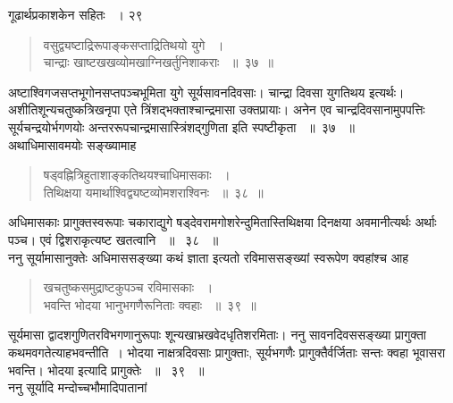 \documentclass[11pt, openany]{book}
\begin{document}
\newpage

\hspace{3cm} गूढार्थप्रकाशकेन सहितः ~। \hfill २९
\vspace{1cm}

 
 \begin{quote}
{\ssi वसुद्व्यष्टाद्रिरूपाङ्कसप्ताद्रितिथयो युगे ~।\\
चान्द्राः खाष्टखखव्योमखाग्निखर्तुनिशाकराः ~॥~३७~॥}
\end{quote}
\begin{sloppypar}
अष्टाश्विगजसप्तभूगोनसप्तपञ्चभूमिता युगे सूर्यसावनदिवसाः। चान्द्रा
दिवसा युगतिथय इत्यर्थः। अशीतिशून्यचतुष्कत्रिखनृपा एते त्रिंशद्भक्ताश्चान्द्रमासा उक्तप्रायाः। अनेन एव चान्द्रदिवसानामुपपत्तिः सूर्यचन्द्रयोर्भगणयोः अन्तररूपचान्द्रमासास्त्रिंशद्गुणिता इति स्पष्टीकृता ~॥~३७~ ॥\\ 
\noindent अथाधिमासावमयोः सङ्ख्यामाह\textendash
\end{sloppypar}
\begin{quote}
 
{\ssi षड्वह्नित्रिहुताशाङ्कतिथयश्चाधिमासकाः ~।\\
तिथिक्षया यमार्थाश्विद्व्यष्टव्योमशराश्विनः ~॥~३८~॥}
\end{quote}
\begin{sloppypar}
अधिमासकाः प्रागुक्तस्वरूपाः चकाराद्युगे षड्देवरामगोशरेन्दुमितास्तिथिक्षया दिनक्षया अवमानीत्यर्थः अर्थाः पञ्च। एवं द्विशराकृत्यष्ट खतत्वानि ~॥~ ३८~ ॥\\
\noindent ननु सूर्यामासानुक्तेः अधिमाससङ्ख्या कथं ज्ञाता इत्यतो रविमाससङ्ख्यां स्वरूपेण क्वहांश्च आह\textendash
\end{sloppypar}
\begin{quote}
 
{\ssi खचतुष्कसमुद्राष्टकुपञ्च रविमासकाः ~।\\
भवन्ति भोदया भानुभगणैरूनिताः क्वहाः ~॥~३९~॥}
\end{quote}
\begin{sloppypar}
सूर्यमासा द्वादशगुणितरविभगणानुरूपाः शून्यखाभ्रखवेदधृतिशरमिताः। ननु सावनदिवससङ्ख्या प्रागुक्ता कथमवगतेत्याह\textendash भवन्तीति~। भोदया नाक्षत्रदिवसाः प्रागुक्ताः, सूर्यभगणैः प्रागुक्तैर्वर्जिताः सन्तः क्वहा भूवासरा भवन्ति। भोदया इत्यादि प्रागुक्तेः ~॥~ ३९~ ॥\\ 
\noindent ननु सूर्यादि मन्दोच्चभौमादिपातानां 
\end{sloppypar}
\end{document}
